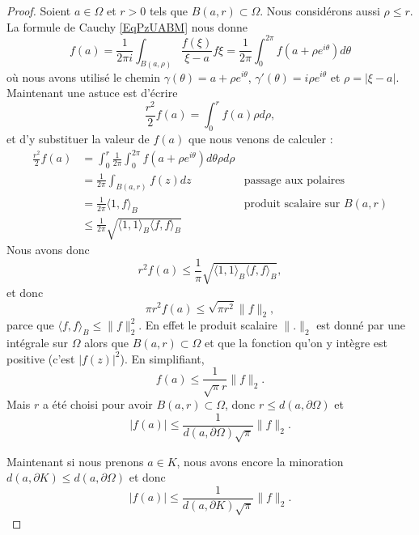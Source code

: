 \begin{proof}
    Soient \( a\in \Omega\) et \( r>0\) tels que \( B(a,r)\subset\Omega\). Nous considérons aussi \( \rho\leq r\). La formule de Cauchy \eqref{EqPzUABM} nous donne
    \begin{equation}
        f(a)=\frac{1}{ 2\pi i }\int_{B(a,\rho)}\frac{ f(\xi) }{ \xi-a }f\xi=\frac{1}{ 2\pi }\int_0^{2\pi}f(a+\rho e^{i\theta})d\theta
    \end{equation}
    où nous avons utilisé le chemin \( \gamma(\theta)=a+\rho e^{i\theta}\), \( \gamma'(\theta)=i\rho e^{i\theta}\) et \( \rho=| \xi-a |\). Maintenant une astuce est d'écrire
    \begin{equation}
        \frac{ r^2 }{2}f(a)=\int_0^rf(a)\rho d\rho,
    \end{equation}
    et d'y substituer la valeur de \( f(a)\) que nous venons de calculer :
    \begin{subequations}
        \begin{align}
            \frac{ r^2 }{2}f(a)&=\int_0^r\frac{1}{ 2\pi }\int_0^{2\pi}f(a+\rho e^{i\theta})d\theta\rho d\rho\\
            &=\frac{1}{ 2\pi }\int_{B(a,r)}f(z)dz   &   \text{passage aux polaires}\\
            &=\frac{1}{ 2\pi }\langle 1, f\rangle_B   &   \text{produit scalaire sur } B(a,r)\\
            &\leq\frac{1}{ 2\pi }\sqrt{\langle 1, 1\rangle_B\langle f, f\rangle_B }
        \end{align}
    \end{subequations}
    Nous avons donc
    \begin{equation}
        r^2f(a)\leq \frac{1}{ \pi }\sqrt{\langle 1, 1\rangle_B\langle f, f\rangle_B},
    \end{equation}
    et donc
    \begin{equation}
        \pi r^2 f(a)\leq \sqrt{\pi r^2}\| f \|_2,
    \end{equation}
    parce que \( \langle f, f\rangle_B\leq \| f \|_2^2\). En effet le produit scalaire \( \| . \|_2\) est donné par une intégrale sur \( \Omega\) alors que \( B(a,r)\subset \Omega\) et que la fonction qu'on y intègre est positive (c'est \( | f(z) |^2\)). En simplifiant,
    \begin{equation}
        f(a)\leq \frac{1}{ \sqrt{\pi}r }\| f \|_2.
    \end{equation}
    Mais \( r\) a été choisi pour avoir \( B(a,r)\subset\Omega\), donc \( r\leq d(a,\partial \Omega)\) et
    \begin{equation}
        | f(a) |\leq \frac{1}{ d(a,\partial\Omega)\sqrt{\pi} }\| f \|_2.
    \end{equation}

    Maintenant si nous prenons \( a\in K\), nous avons encore la minoration \( d(a,\partial K)\leq d(a,\partial \Omega)\) et donc
    \begin{equation}
        | f(a) |\leq\frac{1}{ d(a,\partial K)\sqrt{\pi} }\| f \|_2.
    \end{equation}

\end{proof}

